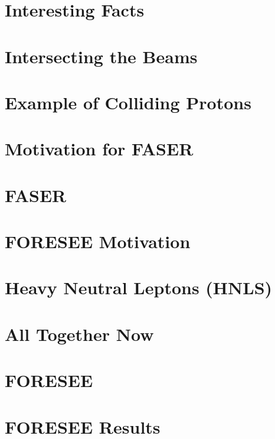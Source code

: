 \documentclass[
	11pt, %
]{beamer}
\begin{document}
\section{Interesting Facts}
\section{Intersecting the Beams}
\section{Example of Colliding Protons}
\section{Motivation for FASER}
\section{FASER}
\section{FORESEE Motivation}
\section{Heavy Neutral Leptons (HNLS)}
\section{All Together Now}
\section{FORESEE}
\section{FORESEE Results}


\end{document}
